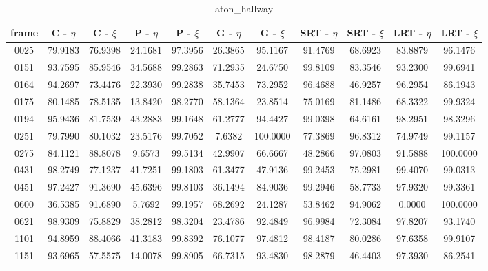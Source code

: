 \begin{appendices}
\begin{table}
\centering
\caption{aton\_hallway}
\begin{tabular}{ |c|c|c|c|c|c|c|c|c|c|c| }
	\hline
\textbf{frame} &  \textbf{C - $\eta$} &  \textbf{C - $\xi$} &  \textbf{P - $\eta$} &  \textbf{P - $\xi$} &  \textbf{G - $\eta$} &  \textbf{G - $\xi$} &  \textbf{SRT - $\eta$} &  \textbf{SRT - $\xi$} &  \textbf{LRT - $\eta$} &  \textbf{LRT - $\xi$} \\
\hline
\hline
0025 &  79.9183 &  76.9398 &   24.1681 &  97.3956 &   26.3865 &  95.1167 &   91.4769 &  68.6923 &   83.8879 &  96.1476   \\
\hline
0151 &  93.7595 &  85.9546 &   34.5688 &  99.2863 &   71.2935 &  24.6750 &   99.8109 &  83.3546 &   93.2300 &  99.6941    \\
\hline
0164 &  94.2697 &  73.4476 &   22.3930 &  99.2838 &   35.7453 &  73.2952 &   96.4688 &  46.9257 &   96.2954 &  86.1943    \\
\hline
0175 &  80.1485 &  78.5135 &   13.8420 &  98.2770 &   58.1364 &  23.8514 &   75.0169 &  81.1486 &   68.3322 &  99.9324    \\
\hline
0194 &  95.9436 &  81.7539 &   43.2883 &  99.1648 &   61.2777 &  94.4427 &   99.0398 &  64.6161 &   98.2951 &  98.3296    \\
\hline
0251 &  79.7990 &  80.1032 &   23.5176 &  99.7052 &   7.6382 &  100.0000 &   77.3869 &  96.8312 &   74.9749 &  99.1157    \\
\hline
0275 &  84.1121 &  88.8078 &   9.6573 &  99.5134 &   42.9907 &  66.6667 &   48.2866 &  97.0803 &   91.5888 &  100.0000    \\
\hline
0431 &  98.2749 &  77.1237 &   41.7251 &  99.1803 &   61.3477 &  47.9136 &   99.2453 &  75.2981 &   99.4070 &  99.0313    \\
\hline
0451 &  97.2427 &  91.3690 &   45.6396 &  99.8103 &   36.1494 &  84.9036 &   99.2946 &  58.7733 &   97.9320 &  99.3361    \\
\hline
0600 &  36.5385 &  91.6890 &   5.7692 &  99.1957 &   68.2692 &  24.1287 &   53.8462 &  94.9062 &   0.0000 &  100.0000    \\
\hline
0621 &  98.9309 &  75.8829 &   38.2812 &  98.3204 &   23.4786 &  92.4849 &   96.9984 &  72.3084 &   97.8207 &  93.1740    \\
\hline
1101 &  94.8959 &  88.4066 &   41.3183 &  99.8392 &   76.1077 &  97.4812 &   98.4187 &  80.0286 &   97.6358 &  99.9107    \\
\hline
1151 &  93.6965 &  57.5575 &   14.0078 &  99.8905 &   66.7315 &  93.4830 &   98.2879 &  46.4403 &   97.3930 &  86.2541   \\


\end{tabular}
\end{table}
\end{appendices}
